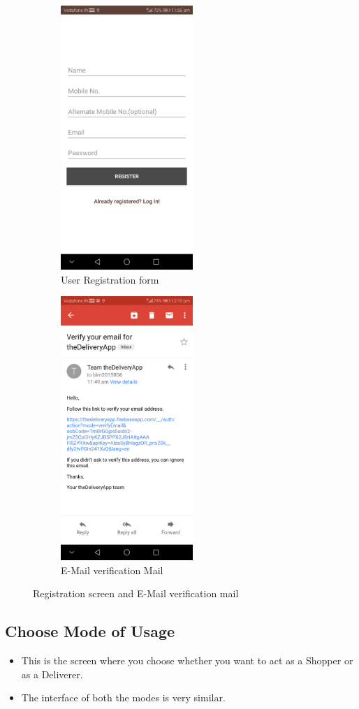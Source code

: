 \documentclass{report}
\begin{document}
\begin{figure}[h!]
\begin{subfigure}[b]{.3\textwidth}
\centering
\includegraphics[width=5cm]{signup.jpg}
\caption{\centering User Registration form}
\end{subfigure}
\begin{subfigure}[b]{.3\textwidth}
\centering
\includegraphics[width=5cm]{verify_email.jpg}
\caption{\centering E-Mail verification Mail}
\end{subfigure}
\caption{Registration screen and E-Mail verification mail} 
\label{fig:NASA_Logo}
\end{figure}


\subsection{Choose Mode of Usage}
\begin{itemize}
\item This is the screen where you choose whether you want to act as a Shopper or as a Deliverer.
\item The interface of both the modes is very similar.
\end{itemize}
\end{document}
